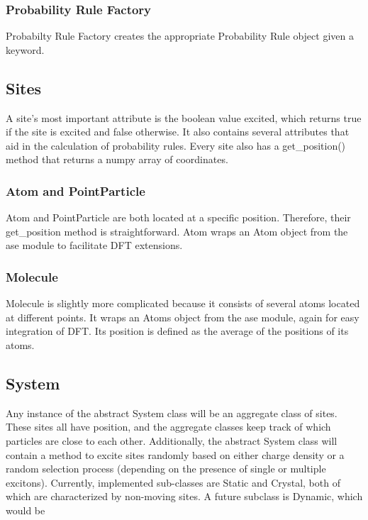 \documentclass{article}
\begin{document}
\subsubsection{Probability Rule Factory}

Probabilty Rule Factory creates the appropriate Probability Rule object given a keyword.




\subsection{Sites}

A site's most important attribute is the boolean value excited, which returns true if the site is excited and false otherwise. It also contains several attributes that aid in the calculation of probability rules. Every site also has a get\_position() method that returns a numpy array of coordinates.

\subsubsection{Atom and PointParticle}

Atom and PointParticle are both located at a specific position. Therefore, their get\_position method is straightforward. Atom wraps an Atom object from the ase module to facilitate DFT extensions.



\subsubsection{Molecule}

Molecule is slightly more complicated because it consists of several atoms located at different points. It wraps an Atoms object from the ase module, again for easy integration of DFT. Its position is defined as the average of the positions of its atoms.

\subsection{System}

Any instance of the abstract System class will be an aggregate class of sites. These sites all have position, and the aggregate classes keep track of which particles are close to each other. Additionally, the abstract System class will contain a method to excite sites randomly based on either charge density or a random selection process (depending on the presence of single or multiple excitons). Currently, implemented sub-classes are Static and Crystal, both of which are characterized by non-moving sites. A future subclass is Dynamic, which would be 
\end{document}
